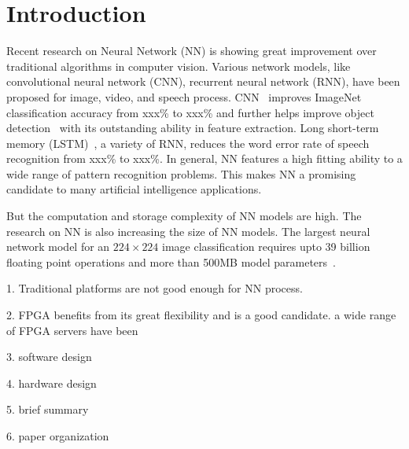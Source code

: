 \section{Introduction}

Recent research on Neural Network (NN) is showing great improvement over traditional algorithms in computer vision. Various network models, like convolutional neural network (CNN), recurrent neural network (RNN), have been proposed for image, video, and speech process. CNN~\cite{} improves ImageNet~\cite{} classification accuracy from xxx\% to xxx\% and further helps improve object detection~\cite{} with its outstanding ability in feature extraction. Long short-term memory (LSTM)~\cite{}, a variety of RNN, reduces the word error rate of speech recognition from xxx\% to xxx\%. In general, NN features a high fitting ability to a wide range of pattern recognition problems. This makes NN a promising candidate to many artificial intelligence applications.

But the computation and storage complexity of NN models are high. The research on NN is also increasing the size of NN models. The largest neural network model for an $224\times224$ image classification requires upto 39 billion floating point operations and more than 500MB model parameters~\cite{}.

1. Traditional platforms are not good enough for NN process.

2. FPGA benefits from its great flexibility and is a good candidate. a wide range of FPGA servers have been 

3. software design

4. hardware design

5. brief summary

6. paper organization